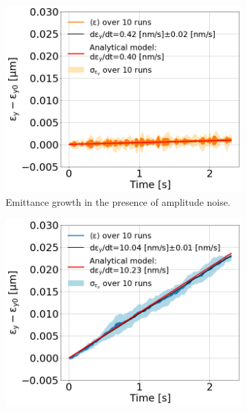 \begin{figure}[!ht]
     \centering
     \begin{subfigure}[t]{0.45\textwidth}
         \centering
         \includegraphics[width=1\textwidth]{./images/app_B/emitGrowth_eyEvolution_sps_270GeV_WakesOFF_ayy1500_QpxQpy1_Nb5e5_IPACvalues_coast1_setting2_AN.png}
         \caption{Emittance growth in the presence of amplitude noise.}
         \label{fig:emitGrowth_AN}
     \end{subfigure}
     \hfill
     \begin{subfigure}[t]{0.45 \textwidth}
         \centering
         \includegraphics[width=1 \textwidth]{./images/app_B/emitGrowth_eyEvolution_sps_270GeV_WakesOFF_ayy1500_QpxQpy1_Nb5e5_IPACvalues_coast1_setting2_PN.png}

\end{subfigure}
\end{figure}
